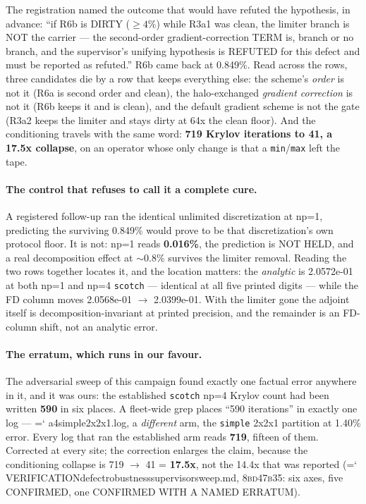 \documentclass[11pt,a4paper]{article}
\newcommand{\artifact}[1]{{\small\ttfamily\hyphenchar\font=`\-\relax
  \def\_{\textunderscore\allowbreak}#1}}
\newcommand{\commit}[1]{\textsc{\small #1}}
\begin{document}
The registration named the outcome that would have refuted the hypothesis, in advance: ``if
R6b is DIRTY (\(\ge 4\%\)) while R3a1 was clean, the limiter branch is NOT the carrier ---
the second-order gradient-correction TERM is, branch or no branch, and the supervisor's
unifying hypothesis is REFUTED for this defect and must be reported as refuted.'' R6b came
back at 0.849\%. Read across the rows, three candidates die by a row that keeps everything
else: the scheme's \emph{order} is not it (R6a is second order and clean), the
halo-exchanged \emph{gradient correction} is not it (R6b keeps it and is clean), and the
default gradient scheme is not the gate (R3a2 keeps the limiter and stays dirty at 64x the
clean floor). And the conditioning travels with the same word: \textbf{719 Krylov iterations
to 41, a 17.5x collapse}, on an operator whose only change is that a \texttt{min}/\texttt{max}
left the tape.

\paragraph{The control that refuses to call it a complete cure.} A registered follow-up ran
the identical unlimited discretization at np=1, predicting the surviving 0.849\% would prove
to be that discretization's own protocol floor. It is not: np=1 reads \textbf{0.016\%}, the
prediction is NOT HELD, and a real decomposition effect at \(\sim0.8\%\) survives the limiter
removal. Reading the two rows together locates it, and the location matters: the
\emph{analytic} is 2.0572e-01 at both np=1 and np=4 \texttt{scotch} --- identical at all five
printed digits --- while the FD column moves 2.0568e-01 \(\rightarrow\) 2.0399e-01. With the
limiter gone the adjoint itself is decomposition-invariant at printed precision, and the
remainder is an FD-column shift, not an analytic error.

\paragraph{The erratum, which runs in our favour.} The adversarial sweep of this campaign
found exactly one factual error anywhere in it, and it was ours: the established
\texttt{scotch} np=4 Krylov count had been written \textbf{590} in six places. A fleet-wide
grep places ``590 iterations'' in exactly one log --- \artifact{a4\_simple2x2x1.log}, a
\emph{different} arm, the \texttt{simple} 2x2x1 partition at 1.40\% error. Every log that ran
the established arm reads \textbf{719}, fifteen of them. Corrected at every site; the
correction enlarges the claim, because the conditioning collapse is 719 \(\rightarrow\) 41 =
\textbf{17.5x}, not the 14.4x that was reported
(\artifact{VERIFICATION\_defect\_robustness\_supervisor\_sweep.md}, \commit{8bd47b35}: six
axes, five CONFIRMED, one CONFIRMED WITH A NAMED ERRATUM).
\end{document}
